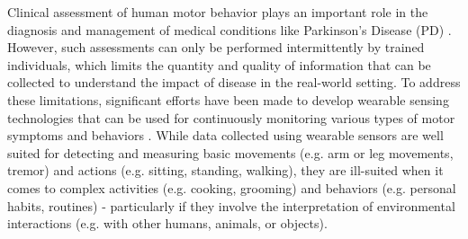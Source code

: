 Clinical assessment of human motor behavior plays an important role in the diagnosis and management of medical conditions like Parkinson's Disease (PD) \cite{post2005unified}. However, such assessments can only be performed intermittently by trained individuals, which limits the quantity and quality of information that can be collected to understand the impact of disease in the real-world setting. To address these limitations, significant efforts have been made to develop wearable sensing technologies that can be used for continuously monitoring various types of motor symptoms and behaviors \cite{thorp2018monitoring, lara2013survey}. While data collected using wearable sensors are well suited for detecting and measuring basic movements (e.g. arm or leg movements, tremor) and actions (e.g. sitting, standing, walking), they are ill-suited when it comes to complex activities (e.g. cooking, grooming) and behaviors (e.g. personal habits, routines) - particularly if they involve the interpretation of environmental interactions (e.g. with other humans, animals, or objects).
\taxonomy

